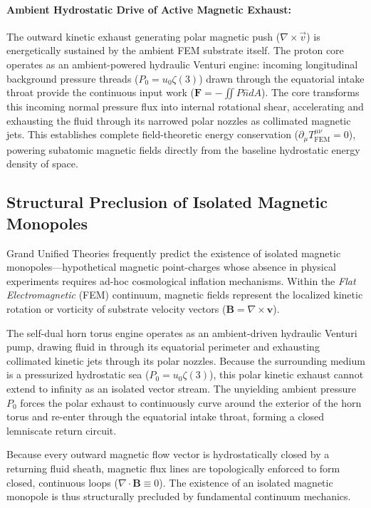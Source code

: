 \documentclass[11pt,a4paper]{article}
\begin{document}
	\paragraph{Ambient Hydrostatic Drive of Active Magnetic Exhaust:}
	The outward kinetic exhaust generating polar magnetic push ($\nabla \times \vec{v}$) is energetically sustained by the ambient FEM substrate itself. The proton core operates as an ambient-powered hydraulic Venturi engine: incoming longitudinal background pressure threads ($P_0 = u_0 \zeta(3)$) drawn through the equatorial intake throat provide the continuous input work ($\mathbf{F} = -\iint P \hat{n} dA$). The core transforms this incoming normal pressure flux into internal rotational shear, accelerating and exhausting the fluid through its narrowed polar nozzles as collimated magnetic jets. This establishes complete field-theoretic energy conservation ($\partial_\mu T^{\mu\nu}_{\text{FEM}} = 0$), powering subatomic magnetic fields directly from the baseline hydrostatic energy density of space.
	
	\subsection{Structural Preclusion of Isolated Magnetic Monopoles}
	Grand Unified Theories frequently predict the existence of isolated magnetic monopoles---hypothetical magnetic point-charges whose absence in physical experiments requires ad-hoc cosmological inflation mechanisms. Within the \textit{Flat Electromagnetic} (FEM) continuum, magnetic fields represent the localized kinetic rotation or vorticity of substrate velocity vectors ($\mathbf{B} = \nabla \times \mathbf{v}$). 
	
	The self-dual horn torus engine operates as an ambient-driven hydraulic Venturi pump, drawing fluid in through its equatorial perimeter and exhausting collimated kinetic jets through its polar nozzles. Because the surrounding medium is a pressurized hydrostatic sea ($P_0 = u_0 \zeta(3)$), this polar kinetic exhaust cannot extend to infinity as an isolated vector stream. The unyielding ambient pressure $P_0$ forces the polar exhaust to continuously curve around the exterior of the horn torus and re-enter through the equatorial intake throat, forming a closed lemniscate return circuit.
	
	Because every outward magnetic flow vector is hydrostatically closed by a returning fluid sheath, magnetic flux lines are topologically enforced to form closed, continuous loops ($\nabla \cdot \mathbf{B} \equiv 0$). The existence of an isolated magnetic monopole is thus structurally precluded by fundamental continuum mechanics.
	
\end{document}
